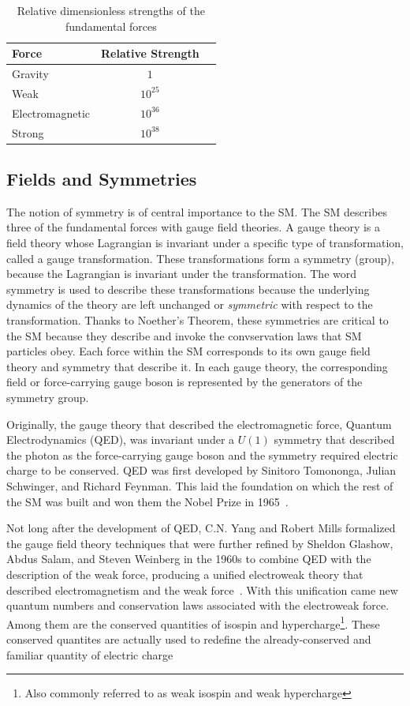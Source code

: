 \begin{table}[hbtp]
\centering
\caption[Relative strengths of the fundamental forces]{Relative dimensionless strengths of the fundamental forces}
\begin{tabular}{lcc}
\hline
Force & Relative Strength \\
\hline
Gravity & $1$ \\
Weak &  $10^{25}$ \\
Electromagnetic & $10^{36}$ \\
Strong & $10^{38}$ \\
\hline
\end{tabular}
\label{tab:force_table}
\end{table}


\subsection{Fields and Symmetries}
The notion of symmetry is of central importance to the SM.
The SM describes three of the fundamental forces with gauge field theories.
A gauge theory is a field theory whose Lagrangian is invariant under a specific type
of transformation, called a gauge transformation. These transformations form a symmetry (group), because the Lagrangian is invariant under the transformation.
The word symmetry is used to describe these transformations because
the underlying dynamics of the theory are left unchanged or \emph{symmetric} with respect to the transformation.
Thanks to Noether's Theorem, these symmetries are critical to the SM because they describe and invoke the convservation laws that SM particles obey.
Each force within the SM corresponds to its own gauge field theory
and symmetry that describe it. In each gauge theory, the corresponding field or force-carrying gauge boson is represented by the generators of the symmetry group. 

Originally, the gauge theory that described the electromagnetic force, Quantum Electrodynamics (QED), was invariant under a $U(1)$ symmetry that described the photon as the
force-carrying gauge boson and the symmetry required electric charge to be conserved. QED was first developed by Sinitoro Tomononga, Julian Schwinger, and Richard Feynman.
This laid the foundation on which the rest of the SM was built and won them the Nobel Prize in 1965~\cite{NP65}. 

Not long after the development of QED, C.N. Yang and Robert Mills formalized the gauge field theory techniques that were further refined by Sheldon Glashow, Abdus Salam,
and Steven Weinberg in the 1960s to combine QED
with the description of the weak force, producing a unified electroweak theory that described electromagnetism and the weak force~\cite{NP79}.
With this unification came new quantum numbers and conservation laws associated with the electroweak force. Among them are the conserved quantities of isospin and hypercharge\footnote{Also commonly
referred to as weak isospin and weak hypercharge}. These conserved quantites are actually used to redefine the already-conserved and familiar quantity of electric charge

